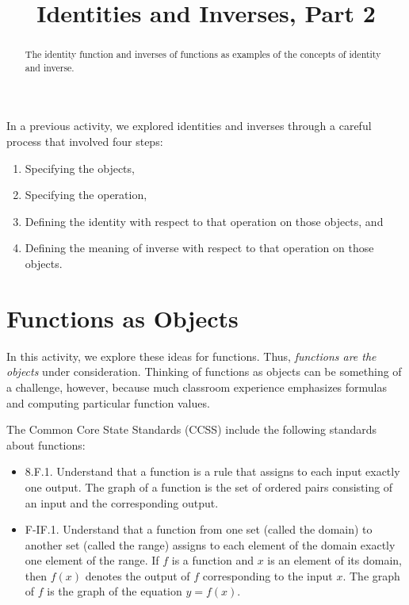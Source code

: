 \documentclass{ximera}
\title{Identities and Inverses, Part 2}
\begin{document}
\begin{abstract}
The identity function and inverses of functions as examples of the concepts of identity and inverse.    
\end{abstract}
\maketitle


%
%
In a previous activity, we explored identities and inverses through a careful process that 
involved four steps:  
\begin{enumerate}
\item Specifying the objects,
\item Specifying the operation, 
\item Defining the identity with respect to that operation on those objects, and
\item Defining the meaning of inverse with respect to that operation on those objects. 
\end{enumerate}

\section*{Functions as Objects}
In this activity, we explore these ideas for functions.  Thus, \emph{functions are the objects} under consideration.  Thinking of functions as objects can be something of a challenge, however, because much classroom experience  emphasizes formulas and computing particular function values.  

The Common Core State Standards (CCSS) include the following standards about functions: 
\begin{itemize}
\item 8.F.1. Understand that a function is a rule that assigns to each input exactly
one output. The graph of a function is the set of ordered pairs
consisting of an input and the corresponding output.

\item F-IF.1. Understand that a function from one set (called the domain) to
another set (called the range) assigns to each element of the domain
exactly one element of the range. If $f$ is a function and $x$ is an element
of its domain, then $f(x)$ denotes the output of $f$ corresponding to the
input $x$. The graph of $f$ is the graph of the equation $y = f(x)$.
\end{itemize}
\end{document}
